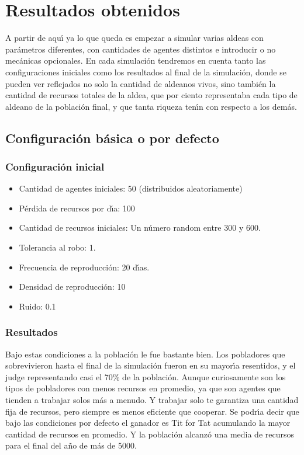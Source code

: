 \documentclass{article}
\begin{document}
\section{Resultados obtenidos}
A partir de aqu\'{\i} ya lo que queda es empezar a simular varias aldeas con par\'ametros diferentes, con cantidades de agentes distintos e introducir o no mec\'anicas opcionales.
En cada simulación tendremos en cuenta tanto las configuraciones iniciales como los resultados al final de la simulación, donde se pueden ver reflejados no solo la cantidad de aldeanos
vivos, sino tambi\'en la cantidad de recursos totales de la aldea, que por ciento representaba cada tipo de aldeano de la poblaci\'on final, y que tanta riqueza ten\'{\i}n con respecto
a los dem\'as.
\subsection{Configuraci\'on b\'asica o por defecto}

\subsubsection{Configuraci\'on inicial}
\begin{itemize}
      \item Cantidad de agentes iniciales: 50 (distribuidos aleatoriamente)
      \item P\'erdida de recursos por d\'{\i}a: 100
      \item Cantidad de recursos iniciales: Un n\'umero random entre 300 y 600.
      \item Tolerancia al robo: 1.
      \item Frecuencia de reproducci\'on: 20 d\'{\i}as.
      \item Densidad de reproducci\'on: 10
      \item Ruido: 0.1
\end{itemize}
\subsubsection{Resultados}
Bajo estas condiciones a la poblaci\'on le fue bastante bien. Los pobladores que sobrevivieron hasta el final de la simulación fueron en su mayor\'{\i}a resentidos, y el judge representando
casi el 70\% de la poblaci\'on. Aunque curiosamente son los tipos de pobladores con menos recursos en promedio, ya que son agentes que tienden a trabajar solos m\'as a menudo. Y trabajar solo
te garantiza una cantidad fija de recursos, pero siempre es menos eficiente que cooperar. Se podr\'{\i}a decir que bajo las condiciones por defecto el ganador es Tit for Tat acumulando la mayor
cantidad de recursos en promedio. Y la poblaci\'on alcanz\'o una media de recursos para el final del a\~no de m\'as de 5000.
\end{document}
